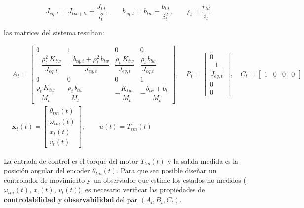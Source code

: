 \documentclass[12pt, a4paper]{article}
\begin{document}
\begin{equation}
    \label{eq:params-eq-t}
    J_{eq,t} = J_{tm+tb} + \frac{J_{td}}{i_t^2}, \qquad
    b_{eq,t} = b_{tm} + \frac{b_{td}}{i_t^2}, \qquad
    \rho_t   = \frac{r_{td}}{i_t}
\end{equation}

las matrices del sistema resultan:

\begin{equation}
    \label{eq:ss-carro}
    \begin{aligned}
    &A_t =
    \begin{bmatrix}
        0 & 1 & 0 & 0 \\[4pt]
        -\dfrac{\rho_t^2\,K_{tw}}{J_{eq,t}} &
        -\dfrac{b_{eq,t}+\rho_t^2\,b_{tw}}{J_{eq,t}} &
         \dfrac{\rho_t\,K_{tw}}{J_{eq,t}} &
         \dfrac{\rho_t\,b_{tw}}{J_{eq,t}} \\[10pt]
        0 & 0 & 0 & 1 \\[4pt]
        \dfrac{\rho_t\,K_{tw}}{M_t} &
        \dfrac{\rho_t\,b_{tw}}{M_t} &
        -\dfrac{K_{tw}}{M_t} &
        -\dfrac{b_{tw}+b_t}{M_t}
    \end{bmatrix}, \quad
    B_t =
    \begin{bmatrix} 0 \\ \dfrac{1}{J_{eq,t}} \\ 0 \\ 0 \end{bmatrix}, \quad
    C_t =
    \begin{bmatrix} 1 & 0 & 0 & 0 \end{bmatrix} \\[10pt]
    &\mathbf{x}_t(t) =
    \begin{bmatrix} \theta_{tm}(t) \\ \omega_{tm}(t) \\ x_t(t) \\ v_t(t) \end{bmatrix},
    \qquad
    u(t) = T_{tm}(t)
    \end{aligned}
\end{equation}

La entrada de control es el torque del motor $T_{tm}(t)$ y la salida medida es la posición
angular del encoder $\theta_{tm}(t)$. Para que sea posible diseñar un controlador de
movimiento y un observador que estime los estados no medidos
($\omega_{tm}(t)$, $x_t(t)$, $v_t(t)$), es necesario verificar las propiedades de
\textbf{controlabilidad} y \textbf{observabilidad} del par $(A_t, B_t, C_t)$.
\end{document}

